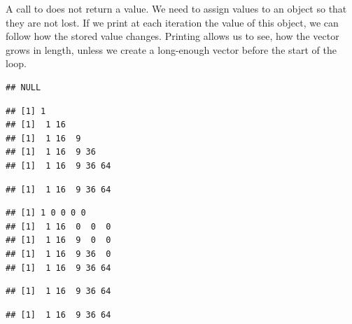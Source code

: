 \documentclass[krantz2]{krantz}\usepackage{knitr}
\begin{document}
A call to  does not return a value. We need to assign values to an object so that they are not lost. If we print at each iteration the value of this object, we can follow how the stored value changes. Printing allows us to see, how the vector grows in length, unless we create a long-enough vector before the start of the loop.

\begin{knitrout}\footnotesize
{}\color{fgcolor}\begin{kframe}
\begin{alltt}
 \hlkwb{<-}   \hlopt{*}\hlstd{\}}
\end{alltt}
\begin{verbatim}
## NULL
\end{verbatim}
\begin{alltt}
 \hlkwb{<-} \hlstd{()}
  \hlstd{(} 
   \hlkwb{<-} \hlopt{^}
\hlstd{\}}
\end{alltt}
\begin{verbatim}
## [1] 1
## [1]  1 16
## [1]  1 16  9
## [1]  1 16  9 36
## [1]  1 16  9 36 64
\end{verbatim}
\begin{alltt}
\end{alltt}
\begin{verbatim}
## [1]  1 16  9 36 64
\end{verbatim}
\begin{alltt}
 \hlkwb{<-} \hlstd{(}
  \hlstd{(} 
   \hlkwb{<-} \hlopt{^}
\hlstd{\}}
\end{alltt}
\begin{verbatim}
## [1] 1 0 0 0 0
## [1]  1 16  0  0  0
## [1]  1 16  9  0  0
## [1]  1 16  9 36  0
## [1]  1 16  9 36 64
\end{verbatim}
\begin{alltt}
\end{alltt}
\begin{verbatim}
## [1]  1 16  9 36 64
\end{verbatim}
\begin{alltt}
 \hlkwb{<-} \hlopt{^}
\end{alltt}
\begin{verbatim}
## [1]  1 16  9 36 64
\end{verbatim}
\end{kframe}
\end{knitrout}
\end{document}
